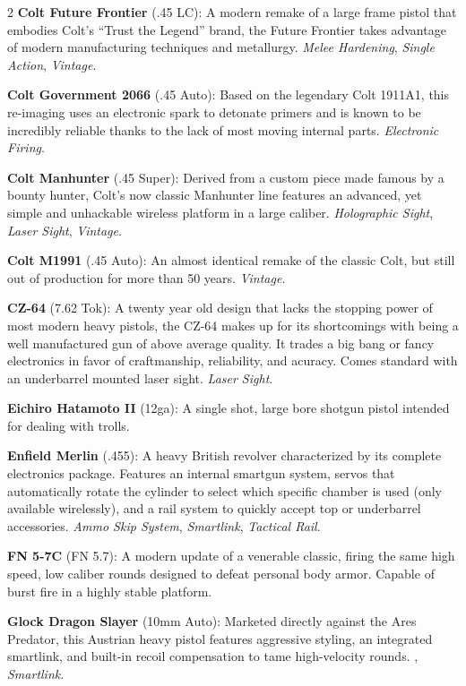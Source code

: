 \documentclass[
  oneside]{article}
\begin{document}
\begin{multicols}{2}
\textbf{Colt Future Frontier} (.45 LC): A modern
remake of a large frame pistol that embodies
Colt's ``Trust the Legend'' brand, the Future
Frontier takes advantage of modern manufacturing
techniques and metallurgy. \emph{Melee Hardening},
\emph{Single Action}, \emph{Vintage}.

\textbf{Colt Government 2066} (.45 Auto): Based on
the legendary Colt 1911A1, this re-imaging uses an
electronic spark to detonate primers and is known
to be incredibly reliable thanks to the lack of
most moving internal parts. \emph{Electronic
Firing}.

\textbf{Colt Manhunter} (.45 Super): Derived from
a custom piece made famous by a bounty hunter,
Colt's now classic Manhunter line features an
advanced, yet simple and unhackable wireless
platform in a large caliber. \emph{Holographic
Sight}, \emph{Laser Sight}, \emph{Vintage}.

\textbf{Colt M1991} (.45 Auto): An almost
identical remake of the classic Colt, but still
out of production for more than 50 years.
\emph{Vintage}.

\textbf{CZ-64} (7.62 Tok): A twenty year old
design that lacks the stopping power of most
modern heavy pistols, the CZ-64 makes up for its
shortcomings with being a well manufactured gun of
above average quality. It trades a big bang or
fancy electronics in favor of craftmanship,
reliability, and acuracy. Comes standard with an
underbarrel mounted laser sight. \emph{Laser
Sight}.

\textbf{Eichiro Hatamoto II} (12ga): A single
shot, large bore shotgun pistol intended for
dealing with trolls.

\textbf{Enfield Merlin} (.455): A heavy British
revolver characterized by its complete electronics
package. Features an internal smartgun system,
servos that automatically rotate the cylinder to
select which specific chamber is used (only
available wirelessly), and a rail system to
quickly accept top or underbarrel accessories.
\emph{Ammo Skip System}, \emph{Smartlink},
\emph{Tactical Rail}.

\textbf{FN 5-7C} (FN 5.7): A modern update of a
venerable classic, firing the same high speed, low
caliber rounds designed to defeat personal body
armor. Capable of burst fire in a highly stable
platform.

\textbf{Glock Dragon Slayer} (10mm Auto): Marketed
directly against the Ares Predator, this Austrian
heavy pistol features aggressive styling, an
integrated smartlink, and built-in recoil
compensation to tame high-velocity rounds. ,
\emph{Smartlink}.


\end{multicols}
\end{document}
